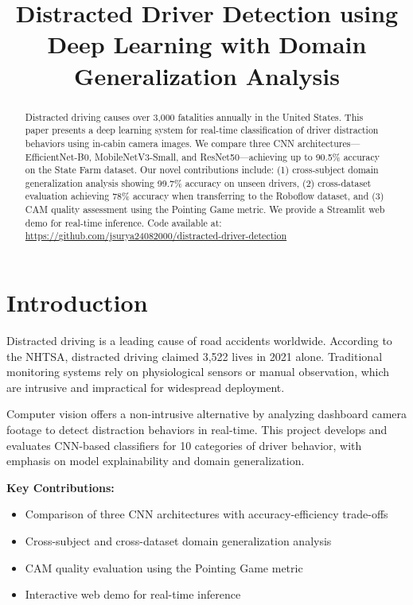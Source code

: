 \documentclass[conference]{IEEEtran}
\title{Distracted Driver Detection using Deep Learning with Domain Generalization Analysis}
\author{
\IEEEauthorblockN{Jayasurya Jayadevan}
\IEEEauthorblockA{121306067\\University of Maryland\\jayasurya@umd.edu}
\and
\IEEEauthorblockN{Karthikaa Mikkilineni}
\IEEEauthorblockA{20602214\\University of Maryland\\karthikaa@umd.edu}
}
\begin{document}
\maketitle

\begin{abstract}
Distracted driving causes over 3,000 fatalities annually in the United States. This paper presents a deep learning system for real-time classification of driver distraction behaviors using in-cabin camera images. We compare three CNN architectures—EfficientNet-B0, MobileNetV3-Small, and ResNet50—achieving up to 90.5\% accuracy on the State Farm dataset. Our novel contributions include: (1) cross-subject domain generalization analysis showing 99.7\% accuracy on unseen drivers, (2) cross-dataset evaluation achieving 78\% accuracy when transferring to the Roboflow dataset, and (3) CAM quality assessment using the Pointing Game metric. We provide a Streamlit web demo for real-time inference. Code available at: \url{https://github.com/jsurya24082000/distracted-driver-detection}
\end{abstract}

\section{Introduction}

Distracted driving is a leading cause of road accidents worldwide. According to the NHTSA, distracted driving claimed 3,522 lives in 2021 alone. Traditional monitoring systems rely on physiological sensors or manual observation, which are intrusive and impractical for widespread deployment.

Computer vision offers a non-intrusive alternative by analyzing dashboard camera footage to detect distraction behaviors in real-time. This project develops and evaluates CNN-based classifiers for 10 categories of driver behavior, with emphasis on model explainability and domain generalization.

\textbf{Key Contributions:}
\begin{itemize}
    \item Comparison of three CNN architectures with accuracy-efficiency trade-offs
    \item Cross-subject and cross-dataset domain generalization analysis
    \item CAM quality evaluation using the Pointing Game metric
    \item Interactive web demo for real-time inference
\end{itemize}
\end{document}
